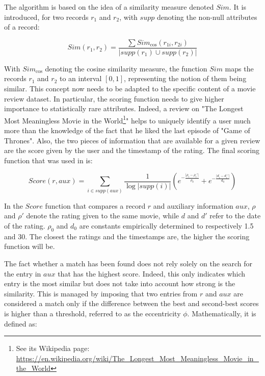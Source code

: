 The algorithm is based on the idea of a similarity measure denoted $Sim$. It is introduced, for two records $r_1$ and $r_2$, with $supp$ denoting the non-null attributes of a record:

\begin{equation}
	Sim(r_1, r_2) = \frac{\sum Sim_{\text{cos}}(r_{1i}, r_{2i})}{\lvert supp(r_1) \cup supp(r_2) \rvert}
\end{equation} 

With $Sim_{\text{cos}}$ denoting the cosine similarity measure, the function $Sim$ maps the records $r_1$ and $r_2$ to an interval $[0,1]$, representing the notion of them being similar. This concept now needs to be adapted to the specific content of a movie review dataset. In particular, the scoring function needs to give higher importance to statistically rare attributes. Indeed, a review on "The Longest Most Meaningless Movie in the World\footnote{See its Wikipedia page: \url{https://en.wikipedia.org/wiki/The_Longest_Most_Meaningless_Movie_in_the_World}}" helps to uniquely identify a user much more than the knowledge of the fact that he liked the last episode of "Game of Thrones". Also, the two pieces of information that are available for a given review are the score given by the user and the timestamp of the rating. The final scoring function that was used in \cite{netflix} is:

\begin{equation}\label{eq:score}
	Score(r,aux) = \sum_{i \in supp(aux)} \frac{1}{\log\lvert supp(i) \rvert} \left( e^{-\frac{ \lvert \rho_i - \rho_i'  \rvert}{\rho_0}} + e^{-\frac{\lvert d_i - d_i' \rvert}{d_0}}\right)
\end{equation}

In the $Score$ function that compares a record $r$ and auxiliary information $aux$, $\rho$ and $\rho'$ denote the rating given to the same movie, while $d$ and $d'$ refer to the date of the rating. $\rho_0$ and $d_0$ are constants empirically determined to respectively 1.5 and 30. The closest the ratings and the timestamps are, the higher the scoring function will be.

The fact whether a match has been found does not rely solely on the search for the entry in $aux$ that has the highest score. Indeed, this only indicates which entry is the most similar but does not take into account how strong is the similarity. This is managed by imposing that two entries from $r$ and $aux$ are considered a match only if the difference between the best and second-best scores is higher than a threshold, referred to as the eccentricity $\phi$. Mathematically, it is defined as:

